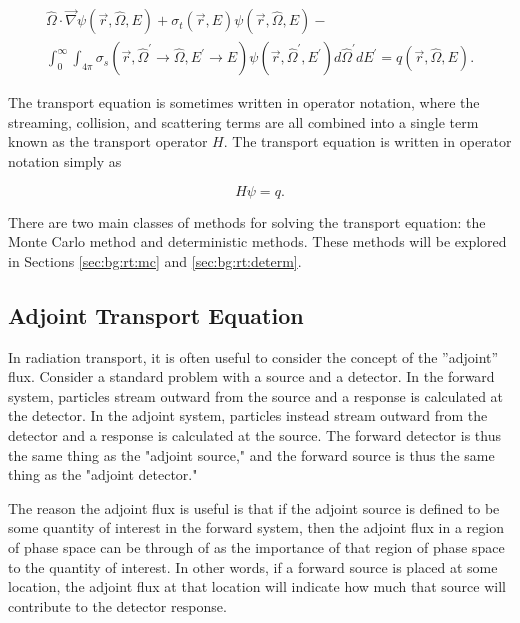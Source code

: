 \begin{multline}\label{eq:bg:rt:transport}
  \hat{\Omega}\cdot\vec{\nabla}\psi\left(\vec{r},\hat{\Omega},E\right) +
  \sigma_t\left(\vec{r},E\right)\psi\left(\vec{r},\hat{\Omega},E\right) - \\
  \int_0^\infty\int_{4\pi}\sigma_s\left(\vec{r},\hat{\Omega}^\prime\rightarrow\hat{\Omega},E^\prime\rightarrow E\right)\psi\left(\vec{r},\hat{\Omega}^\prime,E^\prime\right)d\hat{\Omega}^\prime dE^\prime =
  q\left(\vec{r},\hat{\Omega},E\right).
\end{multline}


The transport equation is sometimes written in operator notation, where the streaming, collision, and scattering terms are all combined into a single term known as the transport operator $H$.
The transport equation is written in operator notation simply as

\begin{equation}\label{eq:bg:rt:transport-operator}
  H\psi = q.
\end{equation}

There are two main classes of methods for solving the transport equation: the Monte Carlo method and deterministic methods.
These methods will be explored in Sections \ref{sec:bg:rt:mc} and \ref{sec:bg:rt:determ}.

\subsection{Adjoint Transport Equation}
\label{sec:bg:rt:adjoint}

In radiation transport, it is often useful to consider the concept of the ''adjoint'' flux.
Consider a standard problem with a source and a detector.
In the forward system, particles stream outward from the source and a response is calculated at the detector.
In the adjoint system, particles instead stream outward from the detector and a response is calculated at the source.
The forward detector is thus the same thing as the "adjoint source," and the forward source is thus the same thing as the "adjoint detector."

The reason the adjoint flux is useful is that if the adjoint source is defined to be some quantity of interest in the forward system, then the adjoint flux in a region of phase space can be through of as the importance of that region of phase space to the quantity of interest.
In other words, if a forward source is placed at some location, the adjoint flux at that location will indicate how much that source will contribute to the detector response.


